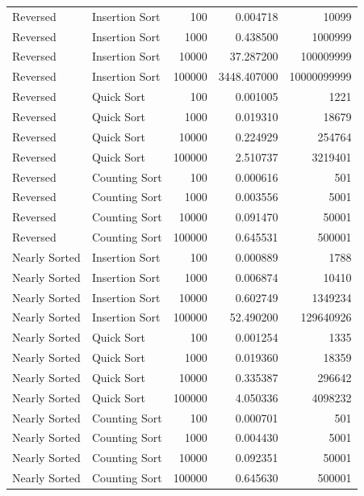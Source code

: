 \begin{center}
\begin{longtable}{llrrr}
Reversed & Insertion Sort & 100 & 0.004718 & 10099 \\
Reversed & Insertion Sort & 1000 & 0.438500 & 1000999 \\
Reversed & Insertion Sort & 10000 & 37.287200 & 100009999 \\
Reversed & Insertion Sort & 100000 & 3448.407000 & 10000099999 \\
Reversed & Quick Sort & 100 & 0.001005 & 1221 \\
Reversed & Quick Sort & 1000 & 0.019310 & 18679 \\
Reversed & Quick Sort & 10000 & 0.224929 & 254764 \\
Reversed & Quick Sort & 100000 & 2.510737 & 3219401 \\
Reversed & Counting Sort & 100 & 0.000616 & 501 \\
Reversed & Counting Sort & 1000 & 0.003556 & 5001 \\
Reversed & Counting Sort & 10000 & 0.091470 & 50001 \\
Reversed & Counting Sort & 100000 & 0.645531 & 500001 \\

Nearly Sorted & Insertion Sort & 100 & 0.000889 & 1788 \\
Nearly Sorted & Insertion Sort & 1000 & 0.006874 & 10410 \\
Nearly Sorted & Insertion Sort & 10000 & 0.602749 & 1349234 \\
Nearly Sorted & Insertion Sort & 100000 & 52.490200 & 129640926 \\
Nearly Sorted & Quick Sort & 100 & 0.001254 & 1335 \\
Nearly Sorted & Quick Sort & 1000 & 0.019360 & 18359 \\
Nearly Sorted & Quick Sort & 10000 & 0.335387 & 296642 \\
Nearly Sorted & Quick Sort & 100000 & 4.050336 & 4098232 \\
Nearly Sorted & Counting Sort & 100 & 0.000701 & 501 \\
Nearly Sorted & Counting Sort & 1000 & 0.004430 & 5001 \\
Nearly Sorted & Counting Sort & 10000 & 0.092351 & 50001 \\
Nearly Sorted & Counting Sort & 100000 & 0.645630 & 500001 \\


\end{longtable}
\end{center}
